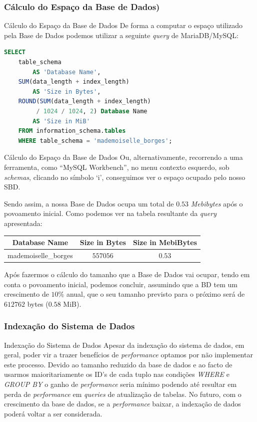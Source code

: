 \documentclass[compress,svgnames,handout,13.7pt]{beamer}
\begin{document}
\subsubsection{C\'{a}lculo do Espa\c{c}o da Base de Dados)}
\begin{frame}[fragile]{C\'{a}lculo do Espa\c{c}o da Base de Dados}
De forma a computar o espaço utilizado pela Base de Dados podemos utilizar a seguinte \textit{query} de MariaDB/MySQL:
\begin{lstlisting}[language=sql]
SELECT 
    table_schema 
        AS 'Database Name', 
    SUM(data_length + index_length)
        AS 'Size in Bytes', 
    ROUND(SUM(data_length + index_length) 
         / 1024 / 1024, 2) Database Name
        AS 'Size in MiB' 
    FROM information_schema.tables
    WHERE table_schema = 'mademoiselle_borges';
\end{lstlisting}
\end{frame}

\begin{frame}{C\'{a}lculo do Espa\c{c}o da Base de Dados}
Ou, alternativamente, recorrendo a uma ferramenta, como ``MySQL Workbench'', no menu contexto esquerdo, sob \textit{schemas}, clicando no símbolo
`i', conseguimos ver o espaço ocupado pelo nosso SBD.

Sendo assim, a nossa Base de Dados ocupa um total de $0.53$ \textit{Mebibytes} após o povoamento inicial.
Como podemos ver na tabela resultante da \textit{query} apresentada:\\
\begin{center}
\begin{tabular}{ |c | c | c |}
    \hline
     Database Name & Size in Bytes & Size in MebiBytes \\
     \hline
     mademoiselle\_borges & $557056$ &   $0.53$ \\ 
    \hline
\end{tabular}
\end{center}

Após fazermos o cálculo do tamanho que a Base de Dados vai ocupar, tendo em conta o povoamento inicial, podemos concluir, assumindo que a BD tem um crescimento de $10\%$ anual, que o seu tamanho previsto para o próximo será de $612762$ bytes ($0.58$ MiB).
\end{frame}

\subsubsection{Indexa\c{c}\~{a}o do Sistema de Dados}
\begin{frame}{Indexa\c{c}\~{a}o do Sistema de Dados}
Apesar da indexação do sistema de dados, em geral, poder vir a trazer benefícios de \textit{performance} optamos por não implementar este processo.
Devido ao tamanho reduzido da base de dados e ao facto de usarmos maioritariamente os ID's de cada tuplo nas condições 
\textit{WHERE} e \textit{GROUP BY} o ganho de \textit{performance} seria mínimo podendo até resultar em perda de \textit{performance} em \textit{queries} de atualização de tabelas. No futuro, com o crescimento da base de dados, se a 
\textit{performance} baixar, a indexação de dados poderá voltar a ser considerada.
\end{frame}
\end{document}
